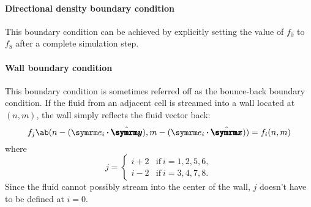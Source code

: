 \paragraph{Directional density boundary condition} This boundary condition can be achieved by explicitly setting the value of $f_0$ to $f_8$ after a complete simulation step.

\paragraph{Wall boundary condition} This boundary condition is sometimes referred off as the bounce-back boundary condition. If the fluid from an adjacent cell is streamed into a wall located at $(n, m)$, the wall simply reflects the fluid vector back:
\begin{equation}
	f_j\ab(n - (\e_i \vdot \yhat), m - (\e_i \vdot \xhat)) = f_i(n, m)
\end{equation}
where
\begin{equation}
	j = \begin{cases}
		i + 2 & \textrm{if} ~ i = 1, 2, 5, 6, \\
		i - 2 & \textrm{if} ~ i = 3, 4, 7, 8.
	\end{cases}
\end{equation}
Since the fluid cannot possibly stream into the center of the wall, $j$ doesn't have to be defined at $i = 0$. \cite{adams-no-date}

